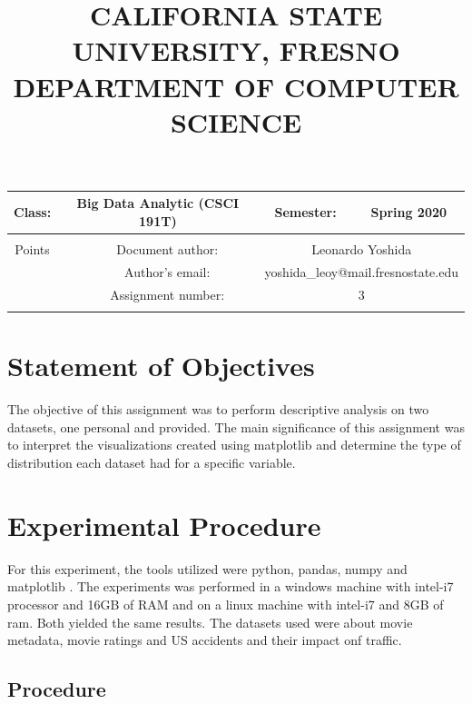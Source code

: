 \documentclass{article}
\title{CALIFORNIA STATE UNIVERSITY, FRESNO    \\DEPARTMENT OF COMPUTER SCIENCE} %
\begin{document}
\maketitle %
\begin{tabular}{|c|c|c|c|c|c|}
	\hline 
	Class: & \multicolumn{3}{c|}{Big Data Analytic (CSCI 191T)} & Semester: & Spring 2020 \\ 
	\hline 
	\multicolumn{6}{|c|}{} \\ 
	\hline 
	Points &  & Document author: & \multicolumn{3}{c|}{Leonardo Yoshida} \\ 
	\hline 
	&  & Author's email: & \multicolumn{3}{c|}{yoshida\_leoy@mail.fresnostate.edu} \\ 
	\hline 
	&  & Assignment number: & \multicolumn{3}{c|}{3} \\ 
	\hline 
	\multicolumn{6}{|c|}{} \\ 
	\hline 
\end{tabular} 


\section{Statement of Objectives}

The objective of this assignment was to perform descriptive analysis on two datasets, one personal and provided. The main significance of this assignment was to interpret the visualizations created using matplotlib and determine the type of distribution each dataset had for a specific variable.

\section{Experimental Procedure} %

For this experiment, the tools utilized were python, pandas, numpy and matplotlib . The experiments was performed in a windows machine with intel-i7 processor and 16GB of RAM and on a linux machine with intel-i7 and 8GB of ram. Both yielded the same results. The datasets used were about movie metadata, movie ratings and US accidents and their impact onf traffic.


\subsection{Procedure}
\end{document}
